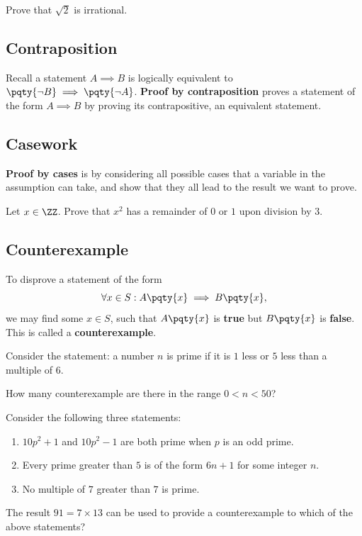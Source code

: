\documentclass{article}
\begin{document}
\begin{example}
    Prove that \(\sqrt{2}\) is irrational.
\end{example}

\subsection{Contraposition}

Recall a statement \(A \implies B\) is logically equivalent to \(\pqty{\lnot B} \implies \pqty{\lnot A}\). \textbf{Proof by contraposition} proves a statement of the form \(A \implies B\) by proving its contrapositive, an equivalent statement.

\subsection{Casework}

\textbf{Proof by cases} is by considering all possible cases that a variable in the assumption can take, and show that they all lead to the result we want to prove.

\begin{example}
    Let \(x \in \ZZ\). Prove that \(x^2\) has a remainder of \(0\) or \(1\) upon division by \(3\).
\end{example}

\subsection{Counterexample}

To disprove a statement of the form
\[
    \forall x \in S: A\pqty{x} \implies B\pqty{x},
\]
we may find some \(x \in S\), such that \(A\pqty{x}\) is \textbf{true} but \(B\pqty{x}\) is \textbf{false}. This is called a \textbf{counterexample}.

\begin{example}[TMUA 2016 P2 Q5]
    Consider the statement: a number \(n\) is prime if it is \(1\) less or \(5\) less than a multiple of \(6\).

    How many counterexample are there in the range \(0 < n < 50\)?
\end{example}

\begin{example}[TMUA 2017 P2 Q5]
    Consider the following three statements:
    \begin{enumerate}[label=\Roman*.]
        \item \(10 p^2 + 1\) and \(10 p^2 - 1\) are both prime when \(p\) is an odd prime.
        \item Every prime greater than \(5\) is of the form \(6n + 1\) for some integer \(n\).
        \item No multiple of \(7\) greater than \(7\) is prime.
    \end{enumerate}

    The result \(91 = 7 \times 13\) can be used to provide a counterexample to which of the above statements?
\end{example}
\end{document}
